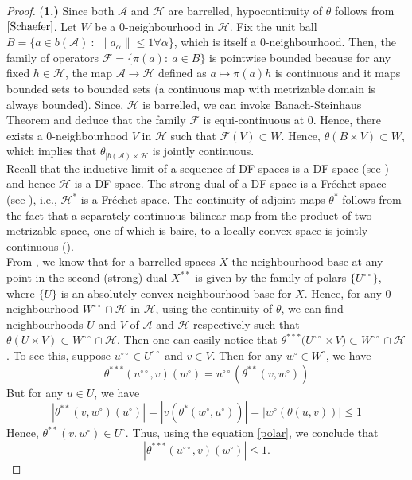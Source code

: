 \documentclass[10pt]{article}
\theoremstyle{definition}
\begin{document}
	\begin{proof}
		{(\bf 1.)} Since both $\mathcal A$ and $\mathcal H$ are barrelled, hypocontinuity of $\theta$ follows from $\cite[5.5.2]{Schaefer}$.	Let $W$ be a $0$-neighbourhood in $\mathcal H$. Fix the unit ball $B=\{a\in b(\mathcal A)~:~\|a_\alpha\|\leq 1\forall \alpha\}$, which is itself a $0$-neighbourhood. Then, the family of operators $\mathcal F=\{\pi(a):~a\in B\}$ is pointwise bounded because for any fixed $h\in \mathcal H$, the map $\mathcal A\to \mathcal H$ defined as $a\mapsto \pi(a)h$ is continuous and it maps bounded sets to bounded sets (a continuous map with metrizable domain is always bounded). Since, $\mathcal H$ is barrelled, we can invoke Banach-Steinhaus Theorem and deduce that the family $\mathcal F$ is equi-continuous at $0$. Hence, there exists a $0$-neighbourhood $V$ in $\mathcal H$ such that $\mathcal F(V)\subset W$. Hence, $\theta(B\times V)\subset W$, which implies that $\theta_{|b(\mathcal A)\times \mathcal H}$ is jointly continuous.\\
		
		 Recall that the inductive limit of a sequence of DF-spaces is a DF-space (see \cite[p196-197]{Schaefer}) and hence $\mathcal H$ is a DF-space. The strong dual of a DF-space is a Fr\'echet space (see \cite[12.4.1]{Jarchow}), i.e., $\mathcal H^*$ is a Fr\'echet space. The continuity of adjoint maps $\theta^*$ follows from the fact that a separately continuous bilinear map from the product of two metrizable space, one of which is baire, to a locally convex space is jointly continuous (\cite[Ch. III, 5.1]{Schaefer}).\\
		
		  From \cite[23.4.1-2]{Kothe}, we know that for a barrelled spaces $X$ the neighbourhood base at any point in the second (strong) dual $X^{**}$ is given by the family of polars $\{U^{\circ\circ}\}$, where $\{U\}$ is an absolutely convex neighbourhood base for $X$. Hence, for any $0$-neighbourhood $W^{\circ\circ}\cap \mathcal H$ in $\mathcal H$, using the continuity of $\theta$, we can find neighbourhoods $U$ and $V$ of $\mathcal A$ and $\mathcal H$ respectively such that $\theta(U\times V)\subset W^{\circ\circ}\cap \mathcal H$. Then one can easily notice that $\theta^{***}\bigl(U^{\circ\circ}\times V\bigr)\subset W^{\circ\circ}\cap\mathcal H$. To see this, suppose $u^{\circ\circ}\in U^{\circ\circ}$ and $v\in V$. Then for any $w^\circ\in W^\circ$, we have 
		\begin{equation}\label{polar}
			\theta^{***}(u^{\circ\circ},v)(w^\circ)=u^{\circ\circ}(\theta^{**}(v,w^\circ))
		\end{equation}
		But for any $u\in U$, we have \begin{equation}
			\left|\theta^{**}(v,w^\circ)(u^\circ)\right|=\left|v\left(\theta^{*}(w^\circ,u^\circ)\right)\right|=|w^\circ(\theta(u,v))|\leq 1 
		\end{equation}
		Hence, $\theta^{**}(v,w^\circ)\in U^\circ$. Thus, using the equation \ref{polar}, we conclude that $$\left|\theta^{***}(u^{\circ\circ},v)(w^\circ)\right|\leq 1.$$
		

\end{proof}
\end{document}
